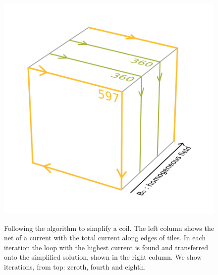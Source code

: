 \begin{figure}
{    \includegraphics[width=.4\linewidth]{gfx/coils/algorithm_simplified_2.pdf}}
  \\
  \quad
  \caption{Following the algorithm to simplify a coil. The left column shows the net of a current with the total current along edges of tiles. In each iteration the loop with the highest current is found and transferred onto the simplified solution, shown in the right column. We show iterations, from top: zeroth, fourth and eighth.}
  \label{fig:simplification_algorithm}
\end{figure}

